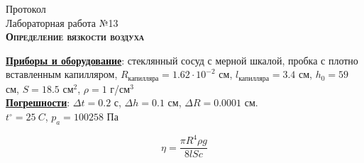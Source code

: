 \documentclass[a4paper,14pt]{extarticle}
\begin{document}
\pagestyle{empty}
\begin{center}
	Протокол\\
	Лабораторная работа №13\\
	\textbf{\textsc{Определение вязкости воздуха}}
\end{center}
\underline{\textbf{Приборы и оборудование}}: стеклянный сосуд с мерной шкалой, пробка с плотно вставленным капилляром, $R_\text{капилляра}=1.62\cdot10^{-2}$ см, $l_\text{капилляра}=3.4$ см, $h_0=59$ см, $S=18.5$ см$^2$, $\rho=1$ г/см$^3$\\
\underline{\textbf{Погрешности}}: $\Delta t=0.2$ с, $\Delta h=0.1$ см, $\Delta R=0.0001$ см. \\$t^\circ=25\ C$, $p_a=100258\text{ Па}$


\vspace{-1em}

\begin{equation*}
	\eta=\frac{\pi R^4\rho g}{8lSc}
\end{equation*}
\vspace{-1em}
\begin{table}[h]
	\label{tab:m}
	\centering
	\pgfplotstabletypeset[
		columns={h,tt1,tt2,tt3,t,pln},	
	columns/h/.style={column name=$h'$},			
	columns/tt1/.style={column name=$t_1$},			
	columns/tt2/.style={column name=$t_2$},			
	columns/tt3/.style={column name=$t_3$},			
	columns/t/.style={column name=$<t>$},			
	columns/pln/.style={column name=$\ln\frac{h_0}{h}$},			
	]{\loadedtable}
\end{table}
\end{document}
